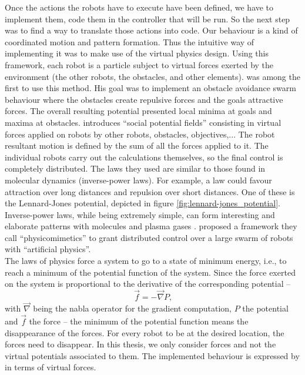 \documentclass[oneside, a4paper, 12pt]{memoir}
\begin{document}
	Once the actions the robots have to execute have been defined, we have to implement them, code them in the controller that will be run. So the next step was to find a way to translate those actions into code. Our behaviour is a kind of coordinated motion and pattern formation. Thus the intuitive way of implementing it was to make use of the virtual physics design. Using this framework, each robot is a particle subject to virtual forces exerted by the environment (the other robots, the obstacles, and other elements). \citet{khatib1986real} was among the first to use this method. His goal was to implement an obstacle avoidance swarm behaviour where the obstacles create repulsive forces and the goals attractive forces. The overall resulting potential presented local minima at goals and maxima at obstacles. \citet{reif1999social} introduces \enquote{social potential fields} consisting in virtual forces applied on robots by other robots, obstacles, objectives,... The robot resultant motion is defined by the sum of all the forces applied to it. The individual robots carry out the calculations themselves, so the final control is completely distributed. The laws they used are similar to those found in molecular dynamics (inverse-power laws). For example, a law could favour attraction over long distances and repulsion over short distances. One of these is the Lennard-Jones potential, depicted in figure \ref{fig:lennard-jones_potential}. Inverse-power laws, while being extremely simple, can form interesting and elaborate patterns with molecules and plasma gases \citep{reif1999social}. \citet{spears2004distributed} proposed a framework they call \enquote{physicomimetics} to grant distributed control over a large swarm of robots with \enquote{artificial physics}.\\
	
	The laws of physics force a system to go to a state of minimum energy, i.e., to reach a minimum of the potential function of the system. Since the force exerted on the system is proportional to the derivative of the corresponding potential -- $$\vec{f} = -\vec{\nabla}P\mbox{,}$$ with $\vec{\nabla}$ being the nabla operator for the gradient computation, $P$ the potential and $\vec{f}$ the force -- the minimum of the potential function means the disappearance of the forces. For every robot to be at the desired location, the forces need to disappear. In this thesis, we only consider forces and not the virtual potentials associated to them. The implemented behaviour is expressed by in terms of virtual forces.\\
	
\end{document}

